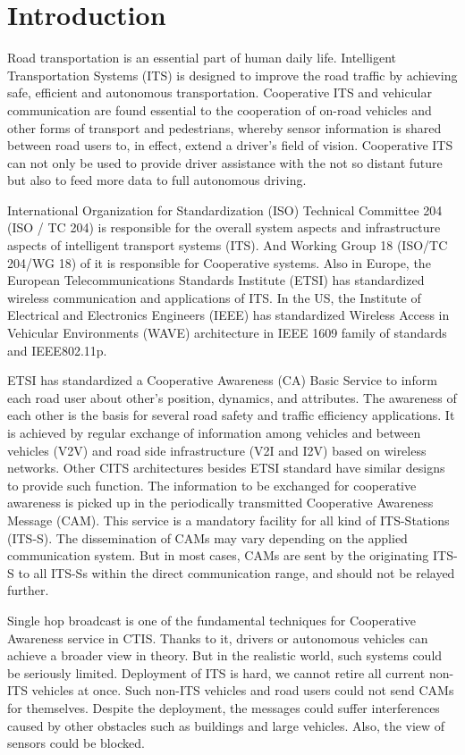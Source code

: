 \section{Introduction} \label{sec:intro}

Road transportation is an essential part of human daily life.
Intelligent Transportation Systems (ITS) is designed to improve the road traffic by achieving safe,
efficient and autonomous transportation.
Cooperative ITS and vehicular communication are found essential to the
cooperation of on-road vehicles and other forms of transport and pedestrians,
whereby sensor information is shared between road users to,
in effect, extend a driver’s field of vision.
Cooperative ITS can not only be used to provide driver assistance with the not so distant future
but also to feed more data to full autonomous driving.

International Organization for Standardization (ISO) Technical Committee 204 (ISO / TC 204)
is responsible for the overall system aspects and infrastructure aspects of intelligent transport systems (ITS).
And Working Group 18 (ISO/TC 204/WG 18) of it is responsible for Cooperative systems.
Also in Europe, the European Telecommunications Standards Institute (ETSI) has standardized wireless communication and applications of ITS.
In the US, the Institute of Electrical and Electronics Engineers (IEEE) has standardized Wireless Access
in Vehicular Environments (WAVE) architecture in IEEE 1609 family of standards and IEEE802.11p.

ETSI has standardized a Cooperative Awareness (CA) Basic Service to inform each road user about other's position, dynamics, and attributes.
The awareness of each other is the basis for several road safety and traffic efficiency applications.
It is achieved by regular exchange of information among vehicles and between vehicles (V2V)
and road side infrastructure (V2I and I2V) based on wireless networks.
Other CITS architectures besides ETSI standard have similar designs to provide such function.
The information to be exchanged for cooperative awareness is picked up in the periodically transmitted Cooperative Awareness Message (CAM).
This service is a mandatory facility for all kind of ITS-Stations (ITS-S).
The dissemination of CAMs may vary depending on the applied communication system.
But in most cases, CAMs are sent by the originating ITS-S to all ITS-Ss within the direct communication range,
and should not be relayed further.

Single hop broadcast is one of the fundamental techniques for Cooperative Awareness service in CTIS.
Thanks to it, drivers or autonomous vehicles can achieve a broader view in theory.
But in the realistic world, such systems could be seriously limited.
Deployment of ITS is hard, we cannot retire all current non-ITS vehicles at once.
Such non-ITS vehicles and road users could not send CAMs for themselves.
Despite the deployment, the messages could suffer interferences caused by other obstacles such as buildings and large vehicles.
Also, the view of sensors could be blocked.


